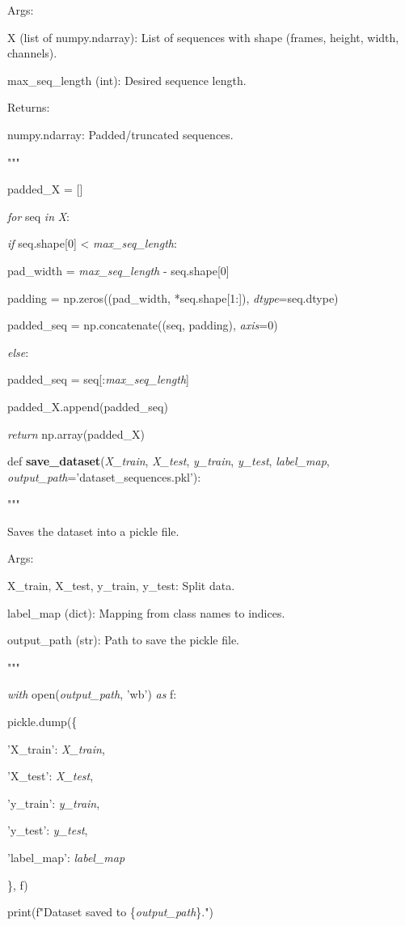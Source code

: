 \documentclass[
]{article}
\begin{document}
Args:

X (list of numpy.ndarray): List of sequences with shape (frames, height, width, channels).

max\_seq\_length (int): Desired sequence length.

Returns:

numpy.ndarray: Padded/truncated sequences.

"""

padded\_X = {[}{]}

\emph{for} seq \emph{in} \emph{X}:

\emph{if} seq.shape{[}0{]} \textless{} \emph{max\_seq\_length}:

pad\_width = \emph{max\_seq\_length} - seq.shape{[}0{]}

padding = np.zeros((pad\_width, *seq.shape{[}1:{]}), \emph{dtype}=seq.dtype)

padded\_seq = np.concatenate((seq, padding), \emph{axis}=0)

\emph{else}:

padded\_seq = seq{[}:\emph{max\_seq\_length}{]}

padded\_X.append(padded\_seq)

\emph{return} np.array(padded\_X)

def \textbf{save\_dataset}(\emph{X\_train}, \emph{X\_test}, \emph{y\_train}, \emph{y\_test}, \emph{label\_map}, \emph{output\_path}='dataset\_sequences.pkl'):

"""

Saves the dataset into a pickle file.

Args:

X\_train, X\_test, y\_train, y\_test: Split data.

label\_map (dict): Mapping from class names to indices.

output\_path (str): Path to save the pickle file.

"""

\emph{with} open(\emph{output\_path}, 'wb') \emph{as} f:

pickle.dump(\{

'X\_train': \emph{X\_train},

'X\_test': \emph{X\_test},

'y\_train': \emph{y\_train},

'y\_test': \emph{y\_test},

'label\_map': \emph{label\_map}

\}, f)

print(f"Dataset saved to \{\emph{output\_path}\}.")
\end{document}
